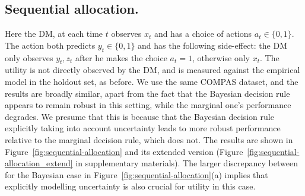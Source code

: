 \subsection{Sequential allocation.}
\label{sec:sequential-experiment}
Here the DM, at each time $t$ observes $x_t$ and has a choice of actions $a_t \in \{0,1\}$. The action both predicts $y_t \in \{0,1\}$ and has the following side-effect: the DM only observes $y_t, z_t$ after he makes the choice $a_t=1$, otherwise only $x_t$. 
The utility is not directly observed by the DM, and is measured against the empirical model in the holdout set, as before. We use the same COMPAS dataset, and the results are broadly similar, apart from the fact that the Bayesian decision rule appears to remain robust in this setting, while the marginal one's performance degrades.
We presume that this is because that the Bayesian decision rule explicitly taking into account uncertainty leads to more robust performance relative to the marginal decision rule, which does not.
The results are shown %
in Figure~\ref{fig:sequential-allocation} and its extended version (Figure~\ref{fig:sequential-allocation_extend} in supplementary materials).
The larger discrepancy between for the Bayesian case
in Figure~\ref{fig:sequential-allocation}(a) implies that explicitly modelling uncertainty is also crucial for utility in this case.






